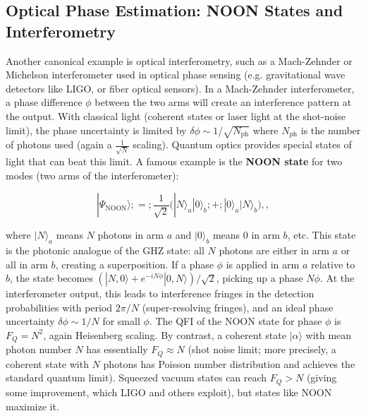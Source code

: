 \subsection{Optical Phase Estimation: NOON States and Interferometry}



Another canonical example is optical interferometry, such as a
Mach-Zehnder or Michelson interferometer used in optical phase sensing
(e.g. gravitational wave detectors like LIGO, or fiber optical
sensors). In a Mach-Zehnder interferometer, a phase difference $\phi$
between the two arms will create an interference pattern at the
output. With classical light (coherent states or laser light at the
shot-noise limit), the phase uncertainty is limited by $\delta \phi
\sim 1/\sqrt{N_{\text{ph}}}$ where $N_{\text{ph}}$ is the number of
photons used (again a $\frac{1}{\sqrt{N}}$ scaling). Quantum optics
provides special states of light that can beat this limit. A famous
example is the \textbf{NOON state} for two modes (two arms of the
interferometer):

\begin{equation}
|\Psi_{\text{NOON}}\rangle ;=; \frac{1}{\sqrt{2}}\big(|N\rangle_a |0\rangle_b ;+; |0\rangle_a |N\rangle_b \big) ,,
\label{eq:NOON}
\end{equation}

where $|N\rangle_a$ means $N$ photons in arm $a$ and $|0\rangle_b$
means 0 in arm $b$, etc. This state is the photonic analogue of the
GHZ state: all $N$ photons are either in arm $a$ or all in arm $b$,
creating a superposition. If a phase $\phi$ is applied in arm $a$
relative to $b$, the state becomes $(|N,0\rangle + e^{-i N
  \phi}|0,N\rangle)/\sqrt{2}$, picking up a phase $N\phi$. At the
interferometer output, this leads to interference fringes in the
detection probabilities with period $2\pi/N$ (super-resolving
fringes), and an ideal phase uncertainty $\delta\phi \sim 1/N$ for
small $\phi$. The QFI of the NOON state for phase $\phi$ is $F_Q =
N^2$, again Heisenberg scaling. By contrast, a coherent state
$|\alpha\rangle$ with mean photon number $N$ has essentially $F_Q
\approx N$ (shot noise limit; more precisely, a coherent state with
$N$ photons has Poisson number distribution and achieves the standard
quantum limit). Squeezed vacuum states can reach $F_Q > N$ (giving
some improvement, which LIGO and others exploit), but states like NOON
maximize it.




